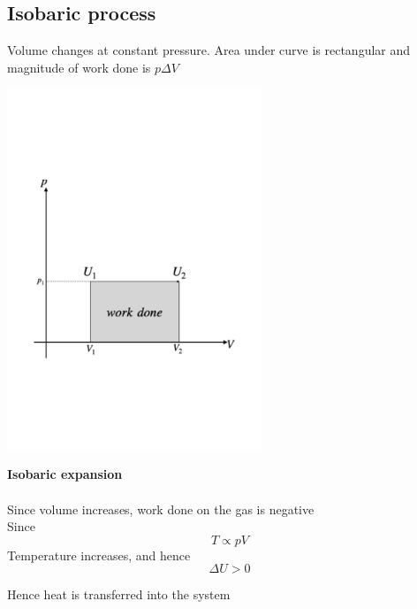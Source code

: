 \documentclass[a4paper, 10pt]{article}
\begin{document}
\subsection{Isobaric process}
Volume changes at constant pressure. Area under curve is rectangular and magnitude of work done is $p\Delta V$ \\
\begin{minipage}{0.5\textwidth}
      \includegraphics[trim = 50 50 50 50, width=3in]{figures/isobaric_expansion.pdf} 
\end{minipage}	
\begin{minipage}{0.5\textwidth}
   \textbf{Isobaric expansion} \\ \\

   Since volume increases, work done on the gas is negative \\
   Since 
   \[
   T \propto pV
   \]
   Temperature increases, and hence
   \[
   \Delta U > 0
   \]

   Hence heat is transferred into the system
\end{minipage}	
\end{document}
